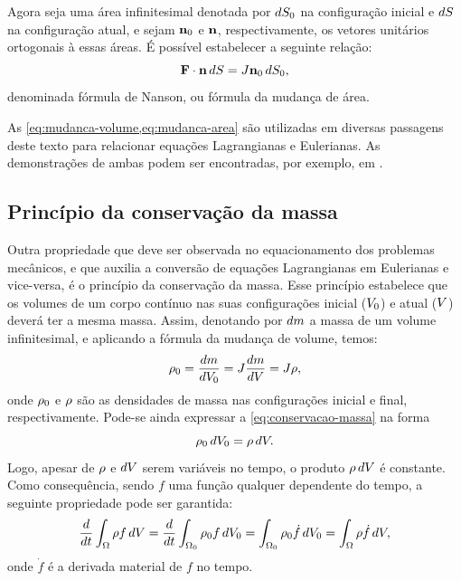 \documentclass[Tese.tex]{subfiles}
\begin{document}
Agora seja uma área infinitesimal denotada por $dS_0$ na configuração inicial e $dS$ na configuração atual, e sejam $\mathbf{n}_0$ e $\mathbf{n}$, respectivamente, os vetores unitários ortogonais à essas áreas. É possível estabelecer a seguinte relação:
\begin{equation}\label{eq:mudanca-area}
\mathbf{F}\cdot\mathbf{n}\, dS = J\mathbf{n}_0\, dS_0,
\end{equation}
denominada fórmula de Nanson, ou fórmula da mudança de área. 

As \cref{eq:mudanca-volume,eq:mudanca-area} são utilizadas em diversas passagens deste texto para relacionar equações Lagrangianas e Eulerianas. As demonstrações de ambas podem ser encontradas, por exemplo, em .

\subsection{Princípio da conservação da massa}\label{sec:conservacao-massa}

Outra propriedade que deve ser observada no equacionamento dos problemas mecânicos, e que auxilia a conversão de equações Lagrangianas em Eulerianas e vice-versa, é o princípio da conservação da massa. Esse princípio estabelece que os volumes de um corpo contínuo nas suas configurações inicial ($V_0$) e atual ($V$) deverá ter a mesma massa. Assim, denotando por $dm$ a massa de um volume infinitesimal, e aplicando a fórmula da mudança de volume, temos:
\begin{equation}\label{eq:conservacao-massa}
\rho_0 = \dfrac{dm}{dV_0} = J\dfrac{dm}{dV} = J\rho,
\end{equation}
onde $\rho_0$ e $\rho$ são as densidades de massa nas configurações inicial e final, respectivamente. Pode-se ainda expressar a \cref{eq:conservacao-massa} na forma
\begin{equation}\label{eq:conservacao-massa2}
\rho_0\,dV_0 = \rho\,dV.
\end{equation}
Logo, apesar de $\rho$ e $dV$ serem variáveis no tempo, o produto $\rho\,dV$ é constante. Como consequência, sendo $f$ uma função qualquer dependente do tempo, a seguinte propriedade pode ser garantida:
\begin{equation}\label{eq:conserv5}
\dfrac{d}{dt}\int_{\Omega}\rho f\,dV = \dfrac{d}{dt}\int_{\Omega_0}\rho_0 f\,dV_0 = \int_{\Omega_0}\rho_0 \dot{f}\,dV_0 = \int_{\Omega}\rho \dot{f}\,dV,
\end{equation}
onde $\dot{f}$ é a derivada material de $f$ no tempo.
\end{document}
